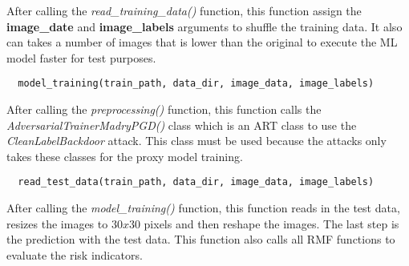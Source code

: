 \noindent After calling the \textit{read\_training\_data()} function, this function assign the \textbf{image\_date} and \textbf{image\_labels} arguments to shuffle the training data. It also can takes a number of images that is lower than the original to execute the ML model faster for test purposes.

\begin{lstlisting}
  model_training(train_path, data_dir, image_data, image_labels)
\end{lstlisting}

\noindent After calling the \textit{preprocessing()} function, this function calls the \textit{AdversarialTrainerMadryPGD()} class which is an ART class to use the \textit{CleanLabelBackdoor} attack. This class must be used because the attacks only takes these classes for the proxy model training.

\begin{lstlisting}
  read_test_data(train_path, data_dir, image_data, image_labels)
\end{lstlisting}

\noindent After calling the \textit{model\_training()} function, this function reads in the test data, resizes the images to $30x30$ pixels and then reshape the images. The last step is the prediction with the test data. This function also calls all RMF functions to evaluate the risk indicators.
